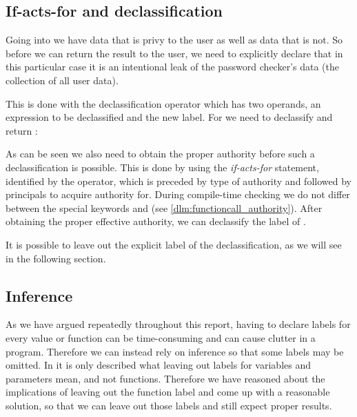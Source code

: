 \subsection{If-acts-for and declassification}\label{ctif:informal:ifactsfor_declassify}
Going into  we have data that is privy to the user as well as data that is not.
So before we can return the result to the user, we need to explicitly declare that in this particular case it is an intentional leak of the password checker's data (the collection of all user data).

This is done with the declassification operator \dlmc{<| |>} which has two operands, an expression to be declassified and the new label.
For  we need to declassify and return :
\begin{center}

\end{center}

As can be seen we also need to obtain the proper authority before such a declassification is possible.
This is done by using the \emph{if-acts-for} statement, identified by the  operator, which is preceded by type of authority and followed by principals to acquire authority for.
During compile-time checking we do not differ between the special keywords  and  (see \cref{dlm:functioncall_authority}).
After obtaining the proper effective authority, we can declassify the label of .

It is possible to leave out the explicit label of the declassification, as we will see in the following section.

\subsection{Inference}\label{ctif:informal:inference}
As we have argued repeatedly throughout this report, having to declare labels for every value or function can be time-consuming and can cause clutter in a program.
Therefore we can instead rely on inference so that some labels may be omitted.
In \cite{myers1997} it is only described what leaving out labels for variables and parameters mean, and not functions.
Therefore we have reasoned about the implications of leaving out the function label and come up with a reasonable solution, so that we can leave out those labels and still expect proper results.

